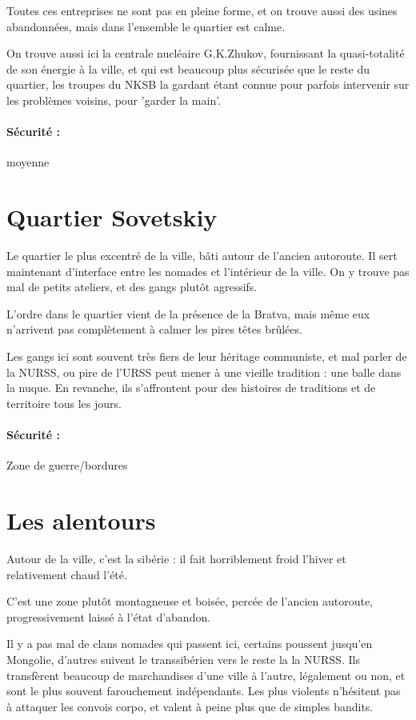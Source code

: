 \documentclass[10pt,a4paper]{book}
\begin{document}
Toutes ces entreprises ne sont pas en pleine forme, et on trouve aussi des usines abandonnées, mais dans l'ensemble le quartier est calme.

On trouve aussi ici la centrale nucléaire G.K.Zhukov, fournissant la quasi-totalité de son énergie à la ville, et qui est beaucoup plus sécurisée que le reste du quartier, les troupes du NKSB la gardant étant connue pour parfois intervenir sur les problèmes voisins, pour 'garder la main'.
\paragraph{Sécurité :}moyenne
\section{Quartier Sovetskiy}
Le quartier le plus excentré de la ville, bâti autour de l'ancien autoroute. Il sert maintenant d'interface entre les nomades et l'intérieur de la ville. On y trouve pas mal de petits ateliers, et des gangs plutôt agressifs.

L'ordre dans le quartier vient de la présence de la Bratva, mais même eux n'arrivent pas complètement  à calmer les pires têtes brûlées.

Les gangs ici sont souvent très fiers de leur héritage communiste, et mal parler de la NURSS, ou pire de l'URSS peut mener à une vieille tradition : une balle dans la nuque. En revanche, ils s'affrontent pour des histoires de traditions et de territoire tous les jours.
\paragraph{Sécurité :}Zone de guerre/bordures
\section{Les alentours}
Autour de la ville, c'est la sibérie : il fait horriblement froid l'hiver et relativement chaud l'été.

C'est une zone plutôt montagneuse et boisée, percée de l'ancien autoroute, progressivement laissé à l'état d'abandon.

Il y a pas mal de clans nomades qui passent ici, certains poussent jusqu'en Mongolie, d'autres suivent le transsibérien vers le reste la la NURSS. Ils transfèrent beaucoup de marchandises d'une ville à l'autre, légalement ou non, et sont le plus souvent farouchement indépendants. Les plus violents n'hésitent pas à attaquer les convois corpo, et valent à peine plus que de simples bandits.
\end{document}
